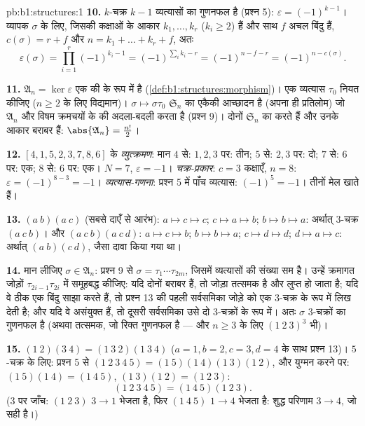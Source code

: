 \begin{solution}{pb:b1:structures:1}
\textbf{10.} $k$-चक्र $k - 1$ व्यत्यासों का गुणनफल है (प्रश्न 5):
$\varepsilon = (-1)^{k-1}$। व्यापक $\sigma$ के लिए, जिसकी कक्षाओं के आकार
$k_1, \dots, k_r$ ($k_i \geq 2$) हैं और साथ $f$ अचल बिंदु हैं, $c(\sigma) =
r + f$ और $n = k_1 + \dots + k_r + f$, अतः
\[
\varepsilon(\sigma) = \prod_{i=1}^r (-1)^{k_i - 1}
= (-1)^{\sum_i k_i - r} = (-1)^{n - f - r} = (-1)^{n -
c(\sigma)} .
\]

\textbf{11.} $\mathfrak A_n = \ker\varepsilon$ एक  की  के रूप
में  है (\cref{def:b1:structures:morphism})। एक व्यत्यास $\tau_0$ नियत
कीजिए ($n \geq 2$ के लिए विद्यमान)।  $\sigma \mapsto
\sigma\tau_0$ $\mathfrak S_n$ का एकैकी आच्छादन है (अपना ही प्रतिलोम) जो
$\mathfrak A_n$ और विषम क्रमचयों के  की अदला-बदली करता है (प्रश्न 9)।
दोनों  $\mathfrak S_n$ का  करते हैं और उनके आकार बराबर हैं:
$\abs{\mathfrak A_n} = \frac{n!}2$।

\textbf{12.} $[4, 1, 5, 2, 3, 7, 8, 6]$ के \emph{व्युत्क्रमण}: मान $4$ से:
$1, 2, 3$ पर: तीन; $5$ से: $2, 3$ पर: दो; $7$ से: $6$ पर: एक; $8$ से: $6$
पर: एक। $N = 7$, $\varepsilon = -1$। \emph{चक्र-प्रकार}: $c = 3$ कक्षाएँ, $n
= 8$: $\varepsilon = (-1)^{8-3} = -1$। \emph{व्यत्यास-गणना}: प्रश्न 5 में
पाँच व्यत्यास: $(-1)^5 = -1$। तीनों मेल खाते हैं।

\textbf{13.} $(a\ b)(a\ c)$ (सबसे दाएँ से आरंभ): $a \mapsto c \mapsto c$; $c
\mapsto a \mapsto b$; $b \mapsto b \mapsto a$: अर्थात् $3$-चक्र $(a\ c\ b)$।
और $(a\ c\ b)(a\ c\ d)$: $a \mapsto c \mapsto b$; $b \mapsto b \mapsto a$;
$c \mapsto d \mapsto d$; $d \mapsto a \mapsto c$: अर्थात् $(a\ b)(c\ d)$,
जैसा दावा किया गया था।

\textbf{14.} मान लीजिए $\sigma \in \mathfrak A_n$: प्रश्न 9 से $\sigma =
\tau_1\cdots\tau_{2m}$, जिसमें व्यत्यासों की संख्या सम है। उन्हें क्रमागत
जोड़ों $\tau_{2i-1}\tau_{2i}$ में समूहबद्ध कीजिए: यदि दोनों बराबर हैं, तो
जोड़ा तत्समक है और लुप्त हो जाता है; यदि वे ठीक एक बिंदु साझा करते हैं, तो
प्रश्न 13 की पहली सर्वसमिका जोड़े को एक $3$-चक्र के रूप में लिख देती है; और
यदि वे असंयुक्त हैं, तो दूसरी सर्वसमिका उसे दो $3$-चक्रों के रूप में। अतः
$\sigma$ $3$-चक्रों का गुणनफल है (अथवा तत्समक, जो रिक्त गुणनफल है --- और $n
\geq 3$ के लिए $(1\ 2\ 3)^3$ भी)।

\textbf{15.} $(1\ 2)(3\ 4) = (1\ 3\ 2)(1\ 3\ 4)$ ($a{=}1, b{=}2, c{=}3,
d{=}4$ के साथ प्रश्न 13)। $5$-चक्र के लिए: प्रश्न 5 से $(1\ 2\ 3\ 4\ 5) =
(1\ 5)(1\ 4)(1\ 3)(1\ 2)$, और युग्मन करने पर: $(1\ 5)(1\ 4) = (1\ 4\ 5)$,
$(1\ 3)(1\ 2) = (1\ 2\ 3)$:
\[
(1\ 2\ 3\ 4\ 5) = (1\ 4\ 5)(1\ 2\ 3) .
\]
($3$ पर जाँच: $(1\ 2\ 3)$ $3 \to 1$ भेजता है, फिर $(1\ 4\ 5)$ $1 \to 4$
भेजता है: शुद्ध परिणाम $3 \to 4$, जो सही है।)


\end{solution}
